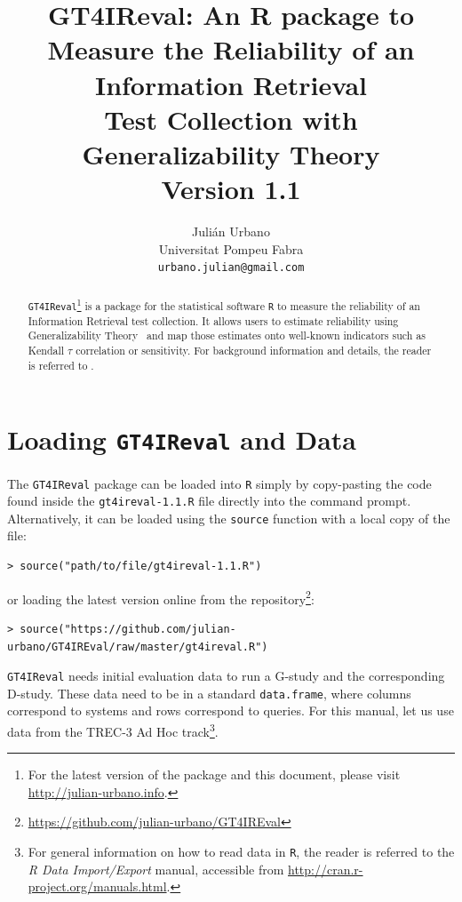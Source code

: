 \documentclass[twoside]{article}
\begin{document}
\title{\textbf{GT4IReval: An R package to Measure the Reliability of an Information Retrieval\\Test Collection with Generalizability Theory\\{\Large Version 1.1}}}
\author{Juli\'an Urbano\\Universitat Pompeu Fabra\\\texttt{urbano.julian@gmail.com}}
\maketitle

\begin{abstract}
\noindent\texttt{GT4IReval}\footnote{For the latest version of the package and this document, please visit \url{http://julian-urbano.info}.} is a package for the statistical software \texttt{R} to measure the reliability of an Information Retrieval test collection. It allows users to estimate reliability using Generalizability Theory~\cite{Brennan2001:generalizability} and map those estimates onto well-known indicators such as Kendall $\tau$ correlation or sensitivity. For background information and details, the reader is referred to \cite{Urbano2013:measurement}.
\end{abstract}

\section{Loading \texttt{GT4IReval} and Data}

The \texttt{GT4IReval} package can be loaded into \texttt{R} simply by copy-pasting the code found inside the \texttt{gt4ireval-1.1.R} file directly into the command prompt. Alternatively, it can be loaded using the \texttt{source} function with a local copy of the file:
{\small\begin{verbatim}
> source("path/to/file/gt4ireval-1.1.R")
\end{verbatim}}
\noindent or loading the latest version online from the repository\footnote{\url{https://github.com/julian-urbano/GT4IREval}}:
{\small\begin{verbatim}
> source("https://github.com/julian-urbano/GT4IREval/raw/master/gt4ireval.R")
\end{verbatim}}

\texttt{GT4IReval} needs initial evaluation data to run a G-study and the corresponding D-study. These data need to be in a standard \texttt{data.frame}, where columns correspond to systems and rows correspond to queries. For this manual, let us use data from the TREC-3 Ad Hoc track\footnote{For general information on how to read data in \texttt{R}, the reader is referred to the \textsl{R Data Import/Export} manual, accessible from \url{http://cran.r-project.org/manuals.html}.}.
\end{document}
